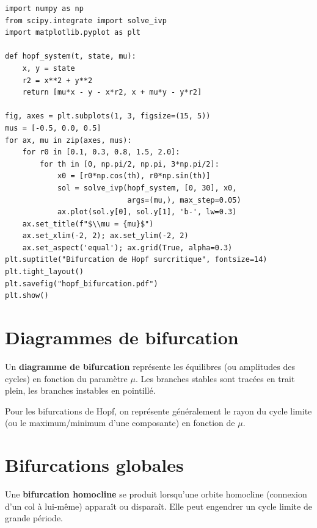 \begin{codeblock}[title=\textbf{Diagramme de bifurcation et Hopf}]
\begin{verbatim}
import numpy as np
from scipy.integrate import solve_ivp
import matplotlib.pyplot as plt

def hopf_system(t, state, mu):
    x, y = state
    r2 = x**2 + y**2
    return [mu*x - y - x*r2, x + mu*y - y*r2]

fig, axes = plt.subplots(1, 3, figsize=(15, 5))
mus = [-0.5, 0.0, 0.5]
for ax, mu in zip(axes, mus):
    for r0 in [0.1, 0.3, 0.8, 1.5, 2.0]:
        for th in [0, np.pi/2, np.pi, 3*np.pi/2]:
            x0 = [r0*np.cos(th), r0*np.sin(th)]
            sol = solve_ivp(hopf_system, [0, 30], x0,
                            args=(mu,), max_step=0.05)
            ax.plot(sol.y[0], sol.y[1], 'b-', lw=0.3)
    ax.set_title(f"$\\mu = {mu}$")
    ax.set_xlim(-2, 2); ax.set_ylim(-2, 2)
    ax.set_aspect('equal'); ax.grid(True, alpha=0.3)
plt.suptitle("Bifurcation de Hopf surcritique", fontsize=14)
plt.tight_layout()
plt.savefig("hopf_bifurcation.pdf")
plt.show()
\end{verbatim}
\end{codeblock}

\section{Diagrammes de bifurcation}

\begin{definition}
Un \textbf{diagramme de bifurcation} repr\'esente les \'equilibres (ou
amplitudes des cycles) en fonction du param\`etre $\mu$. Les branches
stables sont trac\'ees en trait plein, les branches instables en pointill\'e.
\end{definition}

\begin{remarque}
Pour les bifurcations de Hopf, on repr\'esente g\'en\'eralement le rayon du
cycle limite (ou le maximum/minimum d'une composante) en fonction de $\mu$.
\end{remarque}

\section{Bifurcations globales}

\begin{definition}
Une \textbf{bifurcation homocline} se produit lorsqu'une orbite homocline
(connexion d'un col \`a lui-m\^eme) appara\^it ou dispara\^it. Elle peut
engendrer un cycle limite de grande p\'eriode.
\end{definition}

